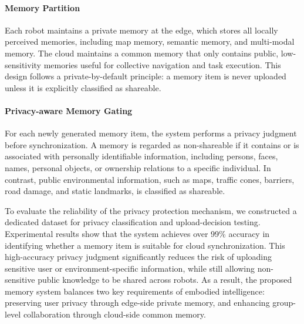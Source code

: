 \paragraph{Memory Partition}
Each robot maintains a private memory at the edge, which stores all locally perceived memories, including map memory, semantic memory, and multi-modal memory. 
The cloud maintains a common memory that only contains public, low-sensitivity memories useful for collective navigation and task execution. 
This design follows a private-by-default principle: a memory item is never uploaded unless it is explicitly classified as shareable.

\paragraph{Privacy-aware Memory Gating}
For each newly generated memory item, the system performs a privacy judgment before synchronization. 
A memory is regarded as non-shareable if it contains or is associated with personally identifiable information, including persons, faces, names, personal objects, or ownership relations to a specific individual. 
In contrast, public environmental information, such as maps, traffic cones, barriers, road damage, and static landmarks, is classified as shareable.


To evaluate the reliability of the privacy protection mechanism, we constructed a dedicated dataset for privacy classification and upload-decision testing. Experimental results show that the system achieves over 99\% accuracy in identifying whether a memory item is suitable for cloud synchronization. This high-accuracy privacy judgment significantly reduces the risk of uploading sensitive user or environment-specific information, while still allowing non-sensitive public knowledge to be shared across robots. As a result, the proposed memory system balances two key requirements of embodied intelligence: preserving user privacy through edge-side private memory, and enhancing group-level collaboration through cloud-side common memory.




